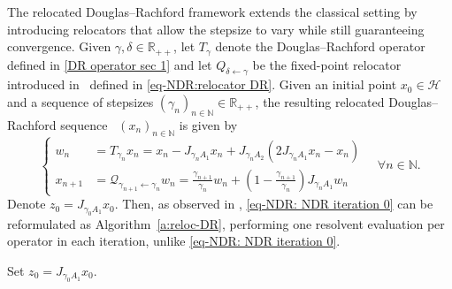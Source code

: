 \documentclass[a4paper,12pt]{article}
\begin{document}
The relocated Douglas--Rachford framework extends the classical setting by introducing relocators that allow the stepsize to vary while still guaranteeing convergence.
Given  $\gamma,\delta\in\mathbb{R_{++}}$, let $T_\gamma$ denote the Douglas--Rachford operator defined in \eqref{DR operator sec 1} and let $Q_{\delta\leftarrow\gamma}$ be the fixed-point relocator introduced in~\cite{atenas2025relocated} defined in \eqref{eq-NDR:relocator DR}.
Given an initial point $x_0\in\mathcal{H}$ and a sequence of stepsizes $(\gamma_n)_{n\in\mathbb{N}}\in\mathbb{R}_{++}$, the resulting relocated Douglas--Rachford sequence~\cite{atenas2025relocated}  $(x_n)_{n\in\mathbb{N}}$ is given by
\begin{equation}\label{eq-NDR: NDR iteration 0}
    \left\{\begin{aligned}
        w_n&=T_{\gamma_n}x_n = x_n-J_{\gamma_nA_1}x_n+J_{\gamma_nA_2}(2J_{\gamma_nA_1}x_n-x_n)\\
        x_{n+1}&=\mathcal{Q}_{\gamma_{n+1}\leftarrow\gamma_n}w_n=\frac{\gamma_{n+1}}{\gamma_n}w_n+\left(1-\frac{\gamma_{n+1}}{\gamma_n}\right)J_{\gamma_n A_1}w_n
    \end{aligned}\right.\quad\forall n\in\mathbb{N}.
\end{equation} Denote $z_0=J_{\gamma_0A_1}x_0$. Then, as observed in \cite[Proposition~4.8]{atenas2025relocated}, \eqref{eq-NDR: NDR iteration 0} can be reformulated as Algorithm~\ref{a:reloc-DR}, performing one resolvent evaluation per operator in each iteration, unlike \eqref{eq-NDR: NDR iteration 0}.

\begin{algorithm}[!ht]
\caption{Relocated Douglas--Rachford algorithm for finding a zero of $A_1+A_2$. \label{a:reloc-DR}}

Set $z_0 = J_{\gamma_0 A_1}x_0$. 

\end{algorithm}
\end{document}
